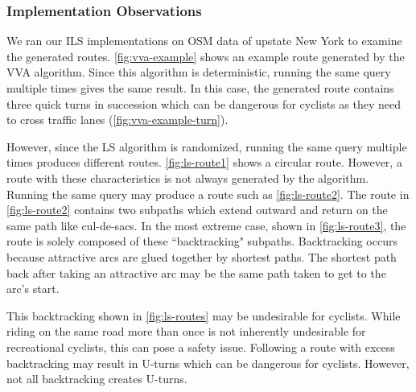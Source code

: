 \documentclass[honors]{union-cs-thesis}
\begin{document}
\subsubsection{Implementation Observations}
\label{sec:ls-observations}
We ran our ILS implementations on OSM data of upstate New York to examine the generated routes. \cref{fig:vva-example} shows an example route generated by the VVA algorithm. Since this algorithm is deterministic, running the same query multiple times gives the same result. In this case, the generated route contains three quick turns in succession which can be dangerous for cyclists as they need to cross traffic lanes (\cref{fig:vva-example-turn}).

However, since the LS algorithm is randomized, running the same query multiple times produces different routes. \cref{fig:ls-route1} shows a circular route. However, a route with these characteristics is not always generated by the algorithm. Running the same query may produce a route such as \cref{fig:ls-route2}. The route in \cref{fig:ls-route2} contains two subpaths which extend outward and return on the same path like cul-de-sacs. In the most extreme case, shown in \cref{fig:ls-route3}, the route is solely composed of these ``backtracking" subpaths. Backtracking occurs because attractive arcs are glued together by shortest paths. The shortest path back after taking an attractive arc may be the same path taken to get to the arc's start.

This backtracking shown in \cref{fig:ls-routes} may be undesirable for cyclists. While riding on the same road more than once is not inherently undesirable for recreational cyclists, this can pose a safety issue. Following a route with excess backtracking may result in U-turns which can be dangerous for cyclists. However, not all backtracking creates U-turns. 
\end{document}
